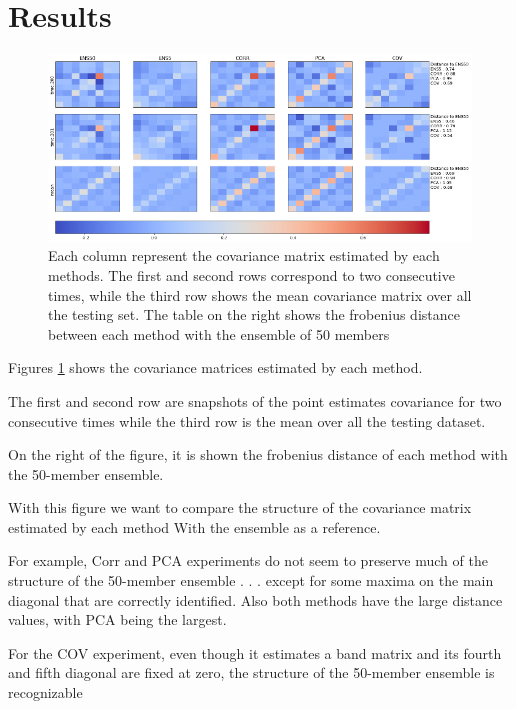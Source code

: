 \documentclass[num-refs]{wiley-article}
\begin{document}
\section{Results}

\begin{figure}[hbt!]
        \includegraphics[width=\textwidth]{images/CovMX.png}
        \caption{Each column represent the covariance matrix estimated by each methods. The first and second rows correspond to two consecutive times, while the third row shows the mean covariance matrix over all the testing set. The table on the right  shows the frobenius distance between each method with the ensemble of 50 members}
\label{FIG:COVMXS}
\end{figure}

Figures \ref{FIG:COVMXS} shows the covariance matrices estimated by each method. 

The first and second row are snapshots of the point estimates covariance for two consecutive times while the third row is the mean over all the testing dataset.

On the right of the figure, it is shown the frobenius distance of each method with the 50-member ensemble.

With this figure we want to compare the structure of the covariance matrix estimated by each method
With the  ensemble as a reference.

For example, Corr and PCA experiments do not seem to preserve much of the structure of the 50-member ensemble . . . except for some maxima on the main diagonal that are correctly identified.  Also both methods have the large distance values,  with PCA being the largest.

For the COV experiment, even though it estimates a band matrix and its fourth and fifth diagonal are fixed at zero, the structure of the 50-member ensemble is recognizable 
\end{document}
